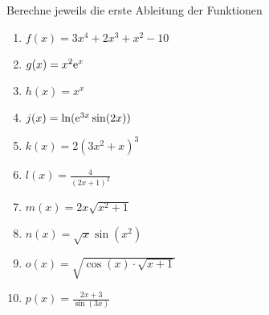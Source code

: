  Berechne jeweils die erste Ableitung der Funktionen
\begin{multicols}{2}
	\begin{enumerate}
		\item $f(x)=3x^4+2x^3+x^2-10$
	  \item $g(x)=x^2\mathrm{e}^x$
		\item $h(x)=x^x$
	  \item $j(x)=\ln(\mathrm{e}^{3x}\sin(2x))$
		\item $k(x) = 2(3x^2+x)^3$
    \item $l(x) = \frac{4}{(2x+1)^2}$
    \item $m(x) = 2x\sqrt{x^2+1}$
    \item $n(x) = \sqrt{x}\sin(x^2)$
    \item $o(x) = \sqrt{\cos(x)\cdot\sqrt{x+1}}$
    \item $p(x) = \frac{2x+3}{\sin(3x)}$
	\end{enumerate}
\end{multicols}

